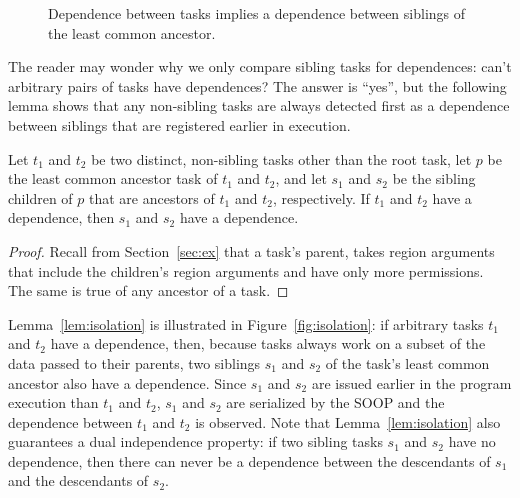 \begin{figure}
\centering
{}
\caption{Dependence between tasks implies a dependence between siblings of the least common ancestor.}
\label{fig:independence}
\end{figure}

The reader may wonder why we only compare sibling tasks for
dependences: can't arbitrary pairs of tasks have dependences?  The
answer is ``yes'', but the following lemma shows that
any non-sibling tasks are always detected first as a dependence between
siblings that are registered earlier in execution.
\begin{lemma}
\label{lem:isolation}
\rm
Let $t_1$ and $t_2$ be two distinct, non-sibling tasks other than the root task, let $p$ be the least
common ancestor task of $t_1$ and $t_2$, and let $s_1$ and $s_2$ be the sibling children of $p$ 
that are ancestors of $t_1$ and $t_2$, respectively.
If $t_1$ and $t_2$ have a dependence, then $s_1$ and $s_2$ have a dependence.
\end{lemma}
\begin{proof}
Recall from Section~\ref{sec:ex} that a task's parent, takes region arguments that include the children's region arguments and have only more permissions.  The same is true of any ancestor of a task.
\end{proof}
Lemma~\ref{lem:isolation} is illustrated in Figure~\ref{fig:isolation}:
if arbitrary tasks $t_1$ and $t_2$ have a dependence, then, because tasks always work on a subset
of the data passed to their parents, two siblings $s_1$ and $s_2$ of the task's
least common ancestor also have a dependence.  Since $s_1$ and $s_2$ are issued earlier in the program
execution than $t_1$ and $t_2$, $s_1$ and $s_2$ are serialized by the SOOP and the dependence between
$t_1$ and $t_2$ is observed.   Note that Lemma~\ref{lem:isolation} also guarantees a dual independence property: if two sibling tasks $s_1$ and $s_2$ have no dependence, then there can never be a dependence between the descendants of $s_1$ and the descendants of $s_2$.

